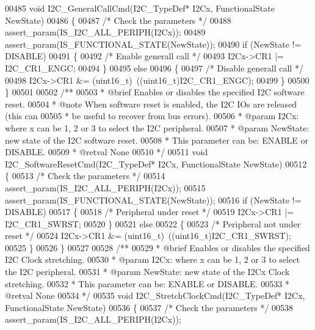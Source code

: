 \begin{DoxyCode}
00485 \textcolor{keywordtype}{void} I2C_GeneralCallCmd(I2C\_TypeDef* I2Cx, FunctionalState NewState)
00486 \{
00487   \textcolor{comment}{/* Check the parameters */}
00488   assert_param(IS\_I2C\_ALL\_PERIPH(I2Cx));
00489   assert_param(IS\_FUNCTIONAL\_STATE(NewState));
00490   \textcolor{keywordflow}{if} (NewState != DISABLE)
00491   \{
00492     \textcolor{comment}{/* Enable generall call */}
00493     I2Cx->CR1 |= I2C_CR1_ENGC;
00494   \}
00495   \textcolor{keywordflow}{else}
00496   \{
00497     \textcolor{comment}{/* Disable generall call */}
00498     I2Cx->CR1 &= (uint16\_t)~((uint16\_t)I2C_CR1_ENGC);
00499   \}
00500 \}
00501 
00502 \textcolor{comment}{/**}
00503 \textcolor{comment}{  * @brief  Enables or disables the specified I2C software reset.}
00504 \textcolor{comment}{  * @note   When software reset is enabled, the I2C IOs are released (this can}
00505 \textcolor{comment}{  *         be useful to recover from bus errors).  }
00506 \textcolor{comment}{  * @param  I2Cx: where x can be 1, 2 or 3 to select the I2C peripheral.}
00507 \textcolor{comment}{  * @param  NewState: new state of the I2C software reset.}
00508 \textcolor{comment}{  *          This parameter can be: ENABLE or DISABLE.}
00509 \textcolor{comment}{  * @retval None}
00510 \textcolor{comment}{  */}
00511 \textcolor{keywordtype}{void} I2C_SoftwareResetCmd(I2C\_TypeDef* I2Cx, FunctionalState NewState)
00512 \{
00513   \textcolor{comment}{/* Check the parameters */}
00514   assert_param(IS\_I2C\_ALL\_PERIPH(I2Cx));
00515   assert_param(IS\_FUNCTIONAL\_STATE(NewState));
00516   \textcolor{keywordflow}{if} (NewState != DISABLE)
00517   \{
00518     \textcolor{comment}{/* Peripheral under reset */}
00519     I2Cx->CR1 |= I2C_CR1_SWRST;
00520   \}
00521   \textcolor{keywordflow}{else}
00522   \{
00523     \textcolor{comment}{/* Peripheral not under reset */}
00524     I2Cx->CR1 &= (uint16\_t)~((uint16\_t)I2C_CR1_SWRST);
00525   \}
00526 \}
00527 
00528 \textcolor{comment}{/**}
00529 \textcolor{comment}{  * @brief  Enables or disables the specified I2C Clock stretching.}
00530 \textcolor{comment}{  * @param  I2Cx: where x can be 1, 2 or 3 to select the I2C peripheral.}
00531 \textcolor{comment}{  * @param  NewState: new state of the I2Cx Clock stretching.}
00532 \textcolor{comment}{  *          This parameter can be: ENABLE or DISABLE.}
00533 \textcolor{comment}{  * @retval None}
00534 \textcolor{comment}{  */}
00535 \textcolor{keywordtype}{void} I2C_StretchClockCmd(I2C\_TypeDef* I2Cx, FunctionalState NewState)
00536 \{
00537   \textcolor{comment}{/* Check the parameters */}
00538   assert_param(IS\_I2C\_ALL\_PERIPH(I2Cx));

\end{DoxyCode}
